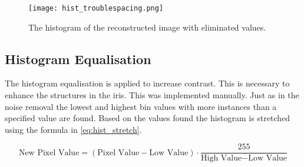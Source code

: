 \begin{figure}[h]
	\centering
	\texttt{[image: hist\_troublespacing.png]}
	\caption{The histogram of the reconstructed image with eliminated values.}
	\label{fig:HistEli}
\end{figure} 

\subsection{Histogram Equalisation}
\label{sec:HistEq}
The histogram equalisation is applied to increase contrast. This is necessary to enhance the structures in the iris. This was implemented manually. Just as in the noise removal the lowest and highest bin values with more instances than a specified value are found. Based on the values found the histogram is stretched using the formula in \autoref{eq:hist_stretch}.

\begin{equation}\label{eq:hist_stretch}
	\text{New~Pixel~Value}=(\text{Pixel~Value}-\text{Low~Value})\cdot\frac{255}{\text{High~Value}-\text{Low~Value}}
\end{equation}

